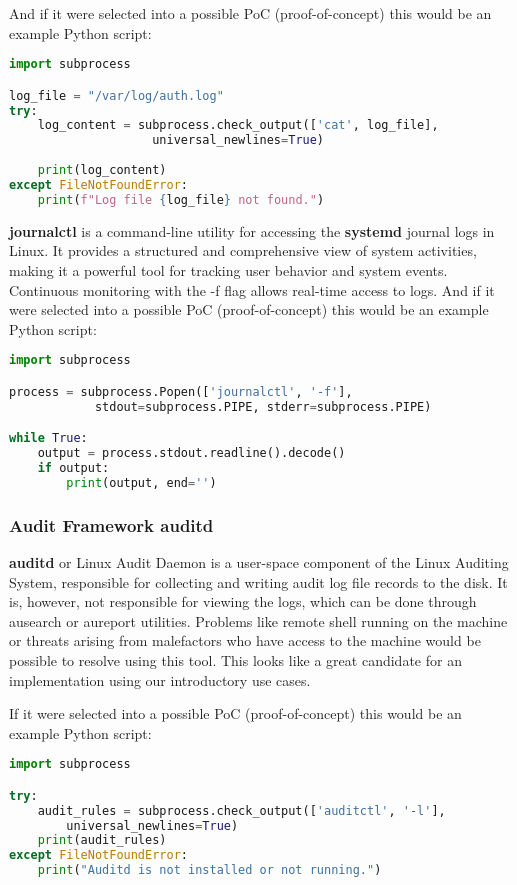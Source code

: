 \documentclass{VUMIFPSmagistrinis}
\begin{document}
\noindent And if it were selected into a possible PoC (proof-of-concept) this would be an example Python script:
\begin{lstlisting}[language=Python]
import subprocess

log_file = "/var/log/auth.log"
try:
    log_content = subprocess.check_output(['cat', log_file], 
                    universal_newlines=True)
    
    print(log_content)
except FileNotFoundError:
    print(f"Log file {log_file} not found.")
\end{lstlisting}

\textbf{journalctl} is a command-line utility for accessing the \textbf{systemd} journal logs in Linux. It provides a structured and comprehensive view of system activities, making it a powerful tool for tracking user behavior and system events. Continuous monitoring with the -f flag allows real-time access to logs. And if it were selected into a possible PoC (proof-of-concept) this would be an example Python script:
\begin{lstlisting}[language=Python]
import subprocess

process = subprocess.Popen(['journalctl', '-f'], 
            stdout=subprocess.PIPE, stderr=subprocess.PIPE)

while True:
    output = process.stdout.readline().decode()
    if output:
        print(output, end='')
\end{lstlisting}

\subsubsection{Audit Framework auditd}
\textbf{auditd} or Linux Audit Daemon is a user-space component of the Linux Auditing System, responsible for collecting and writing audit log file records to the disk. It is, however, not responsible for viewing the logs, which can be done through ausearch or aureport utilities. Problems like remote shell running on the machine or threats arising from malefactors who have access to the machine would be possible to resolve using this tool. This looks like a great candidate for an implementation using our introductory use cases.

If it were selected into a possible PoC (proof-of-concept) this would be an example Python script:
\begin{lstlisting}[language=Python]
import subprocess

try:
    audit_rules = subprocess.check_output(['auditctl', '-l'], 
        universal_newlines=True)
    print(audit_rules)
except FileNotFoundError:
    print("Auditd is not installed or not running.")
\end{lstlisting}
\end{document}
